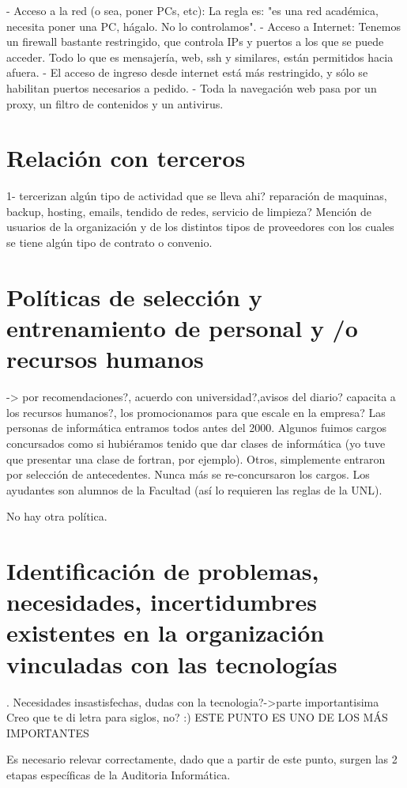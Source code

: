 \documentclass[10pt,a4paper,final]{article}
\begin{document}

- Acceso a la red (o sea, poner PCs, etc): La regla es: "es una red académica, necesita poner una PC, hágalo. No lo controlamos".
- Acceso a Internet: Tenemos un firewall bastante restringido, que controla IPs y puertos a los que se puede acceder. Todo lo que es mensajería, web, ssh y similares, están permitidos hacia afuera.
  - El acceso de ingreso desde internet está más restringido, y sólo se habilitan puertos necesarios a pedido.
- Toda la navegación web pasa por un proxy, un filtro de contenidos y un antivirus.
\section{Relación con terceros}
1- tercerizan algún tipo de actividad que se lleva ahi? reparación de maquinas, backup, hosting, emails, tendido de redes, servicio de limpieza?
Mención de usuarios de la organización y de los distintos tipos de proveedores con los cuales se tiene algún tipo de contrato o convenio.

\section{Políticas de selección y entrenamiento de personal y /o recursos humanos}
 -> por recomendaciones?, acuerdo con universidad?,avisos del diario? capacita a los recursos humanos?, los promocionamos para que escale en la empresa?
   Las personas de informática entramos todos antes del 2000. Algunos fuimos cargos concursados como si hubiéramos tenido que dar clases de informática (yo tuve que presentar una clase de fortran, por ejemplo). Otros, simplemente entraron por selección de antecedentes. Nunca más se re-concursaron los cargos. Los ayudantes son alumnos de la Facultad (así lo requieren las reglas de la UNL).

          No hay otra política. 
\section{Identificación de problemas, necesidades, incertidumbres existentes en la organización vinculadas con las tecnologías}. Necesidades insastisfechas, dudas con la tecnologia?->parte importantisima
 Creo que te di letra para siglos, no? :)
 ESTE PUNTO ES UNO DE LOS MÁS IMPORTANTES

Es necesario relevar correctamente, dado que a partir de este punto, surgen las 2 etapas específicas de la Auditoria Informática.
\end{document}
